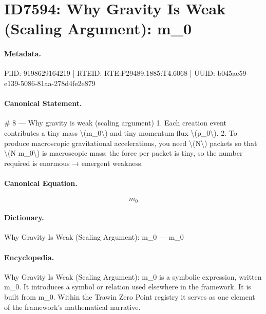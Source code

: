 \section*{ID7594: Why Gravity Is Weak (Scaling Argument): m\_0}
\paragraph{Metadata.}
PiID: 9198629164219 | RTEID: RTE:P29489.1885:T4.6068 | UUID: b045ae59-e139-5086-81aa-278d4fe2e879

\paragraph{Canonical Statement.}
\# 8 — Why gravity is weak (scaling argument) 1. Each creation event contributes a tiny mass \textbackslash{}(m\_0\textbackslash{}) and tiny momentum flux \textbackslash{}(p\_0\textbackslash{}). 2. To produce macroscopic gravitational accelerations, you need \textbackslash{}(N\textbackslash{}) packets so that \textbackslash{}(N m\_0\textbackslash{}) is macroscopic mass; the force per packet is tiny, so the number required is enormous → emergent weakness.

\paragraph{Canonical Equation.}
\[
m_0
\]

\paragraph{Dictionary.}
Why Gravity Is Weak (Scaling Argument): m\_0 — m\_0

\paragraph{Encyclopedia.}
Why Gravity Is Weak (Scaling Argument): m\_0 is a symbolic expression, written m\_0. It introduces a symbol or relation used elsewhere in the framework. It is built from m\_0. Within the Trawin Zero Point registry it serves as one element of the framework's mathematical narrative.
